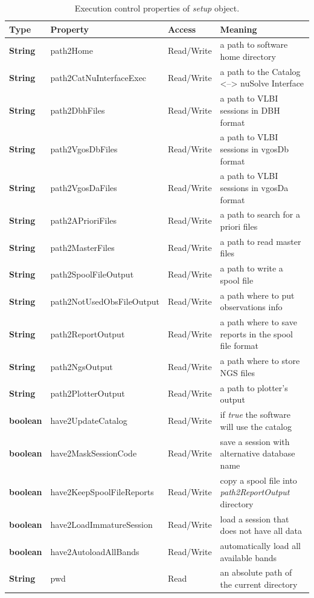 \documentclass [10pt,letterpaper]{report}
\begin{document}
\begin{table}[htb]
\centering
\footnotesize
\begin{tabular}{lllp{}}
\hline
Type & Property & Access & Meaning\\
\hline
  {\bf String}   & path2Home                 & Read/Write & a path to software home directory\\
  {\bf String}   & path2CatNuInterfaceExec   & Read/Write & a path to the Catalog <--> nuSolve Interface \\
  {\bf String}   & path2DbhFiles             & Read/Write & a path to VLBI sessions in DBH format \\
  {\bf String}   & path2VgosDbFiles          & Read/Write & a path to VLBI sessions in vgosDb format\\
  {\bf String}   & path2VgosDaFiles          & Read/Write & a path to VLBI sessions in vgosDa format\\
  {\bf String}   & path2APrioriFiles         & Read/Write & a path to search for a priori files\\
  {\bf String}   & path2MasterFiles          & Read/Write & a path to read master files\\
  {\bf String}   & path2SpoolFileOutput      & Read/Write & a path to write a spool file\\
  {\bf String}   & path2NotUsedObsFileOutput & Read/Write & a path where to put observations info\\
  {\bf String}   & path2ReportOutput         & Read/Write & a path where to save reports in the spool file format\\
  {\bf String}   & path2NgsOutput            & Read/Write & a path where to store NGS files\\
  {\bf String}   & path2PlotterOutput        & Read/Write & a path to plotter's output\\
  {\bf boolean}  & have2UpdateCatalog        & Read/Write & if {\sl true} the software will use the catalog\\
  {\bf boolean}  & have2MaskSessionCode      & Read/Write & save a session with alternative database name\\
  {\bf boolean}  & have2KeepSpoolFileReports & Read/Write & copy a spool file into {\sl path2ReportOutput} directory\\
  {\bf boolean}  & have2LoadImmatureSession  & Read/Write & load a session that does not have all data\\
  {\bf boolean}  & have2AutoloadAllBands     & Read/Write & automatically load all available bands\\
  {\bf String}   & pwd                       & Read       & an absolute path of the current directory\\
\hline
\end{tabular}
\caption{Execution control properties of {\sl setup} object.}
\label{tab-scr-setup-properties}
\end{table}
\end{document}
